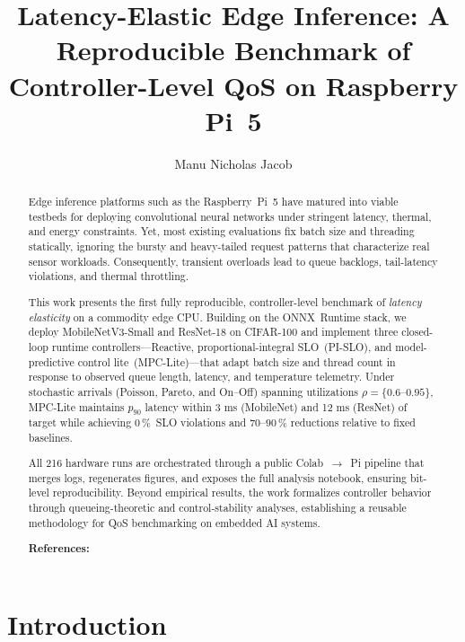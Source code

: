 \documentclass[acmsmall]{acmart}
\title{Latency-Elastic Edge Inference: A Reproducible Benchmark of Controller-Level QoS on Raspberry Pi~5}
\author{Manu Nicholas Jacob}
\affiliation{%
  \institution{Independant researcher}
  \city{Austin}
  \state{TX}
  \country{USA}
}
\begin{document}
\begin{abstract}
Edge inference platforms such as the Raspberry~Pi~5 have matured into viable testbeds for deploying convolutional neural networks under stringent latency, thermal, and energy constraints. Yet, most existing evaluations fix batch size and threading statically, ignoring the bursty and heavy-tailed request patterns that characterize real sensor workloads. Consequently, transient overloads lead to queue backlogs, tail-latency violations, and thermal throttling. 

This work presents the first fully reproducible, controller-level benchmark of \emph{latency elasticity} on a commodity edge CPU.  Building on the ONNX~Runtime stack, we deploy MobileNetV3-Small and ResNet-18 on CIFAR-100 and implement three closed-loop runtime controllers—Reactive, proportional-integral SLO~(PI-SLO), and model-predictive control lite~(MPC-Lite)—that adapt batch size and thread count in response to observed queue length, latency, and temperature telemetry.  Under stochastic arrivals (Poisson, Pareto, and On--Off) spanning utilizations $\rho{=}\{0.6{\text{–}}0.95\}$, MPC-Lite maintains $p_{90}$ latency within 3 ms (MobileNet) and 12 ms (ResNet) of target while achieving $0\,\%$~SLO violations and $70{\text{–}}90\,\%$ reductions relative to fixed baselines.  

All 216 hardware runs are orchestrated through a public Colab~$\rightarrow$~Pi pipeline that merges logs, regenerates figures, and exposes the full analysis notebook, ensuring bit-level reproducibility.  Beyond empirical results, the work formalizes controller behavior through queueing-theoretic and control-stability analyses, establishing a reusable methodology for QoS benchmarking on embedded AI systems.  

\vspace{0.3em}
\textbf{References:}~\cite{banbury2021mlperf, howard2019mobilenetv3, szegedy2015going, matsubara2022split, hu2022dynamic, reddi2020mlperf, sze2017efficient}
\end{abstract}


\maketitle
\section{Introduction}
\end{document}

